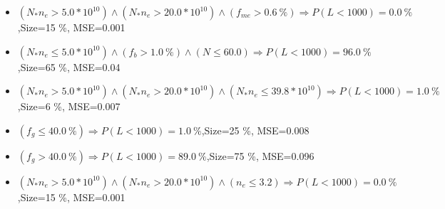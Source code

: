 \documentclass[numbered]{CSL}
\begin{document}
\begin{itemize}
\item $(N_* n_e > 5.0 * 10^{10}) \land (N_* n_e > 20.0 * 10^{10}) \land (f_{me} > 0.6~\%) \Rightarrow P(L < 1 000) = 0.0~\%$,\hfill Size=15 \%, MSE=0.001
\item $(N_* n_e \leq 5.0 * 10^{10}) \land (f_b > 1.0~\%) \land (N \leq 60.0) \Rightarrow P(L < 1 000) = 96.0~\%$,\hfill Size=65 \%, MSE=0.04
\item $(N_* n_e > 5.0 * 10^{10}) \land (N_* n_e > 20.0 * 10^{10}) \land (N_* n_e \leq 39.8 * 10^{10}) \Rightarrow P(L < 1 000) = 1.0~\%$,\hfill Size=6 \%, MSE=0.007
\item $(f_g \leq 40.0~\%) \Rightarrow P(L < 1 000) = 1.0~\%$,\hfill Size=25 \%, MSE=0.008
\item $(f_g > 40.0~\%) \Rightarrow P(L < 1 000) = 89.0~\%$,\hfill Size=75 \%, MSE=0.096
\item $(N_* n_e > 5.0 * 10^{10}) \land (N_* n_e > 20.0 * 10^{10}) \land (n_e \leq 3.2) \Rightarrow P(L < 1 000) = 0.0~\%$,\hfill Size=15 \%, MSE=0.001
\end{itemize}
\end{document}
